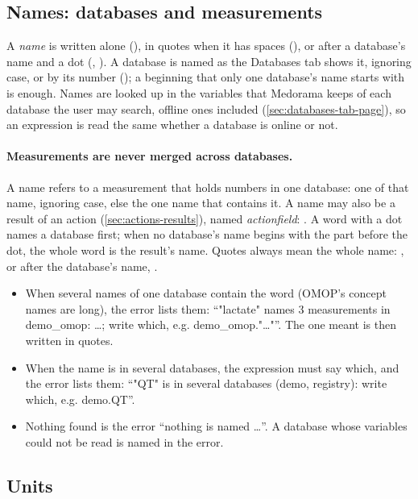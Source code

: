 \subsection{Names: databases and measurements}
\label{sec:cohorts-names}

A \emph{name} is written alone (), in quotes when it has spaces (), or
after a database's name and a dot (, ). A database is named as the Databases tab shows it, ignoring case, or by its number
(); a beginning that only one database's name starts with is enough. Names are looked
up in the variables that Medorama keeps of each database the user may search, offline ones
included (\cref{sec:databases-tab-page}), so an expression is read the same whether a database is
online or not.

\paragraph{Measurements are never merged across databases.} A name refers to a measurement that
holds numbers in one database: one of that name, ignoring case, else the one name that contains
it. A name may also be a result of an action (\cref{sec:actions-results}), named
\emph{action}\emph{field}: . A word with a dot names a database
first; when no database's name begins with the part before the dot, the whole word is the
result's name. Quotes always mean the whole name: , or after the
database's name, .
\begin{itemize}
\item When several names of one database contain the word (OMOP's concept names are long), the
  error lists them: ``"lactate" names 3 measurements in demo\_omop: \dots; write which, e.g.
  demo\_omop."\dots"''. The one meant is then written in quotes.
\item When the name is in several databases, the expression must say which, and the error lists
  them: ``"QT" is in several databases (demo, registry): write which, e.g. demo.QT''.
\item Nothing found is the error ``nothing is named \dots''. A database whose variables could
  not be read is named in the error.
\end{itemize}

\subsection{Units}
\label{sec:cohorts-units}

